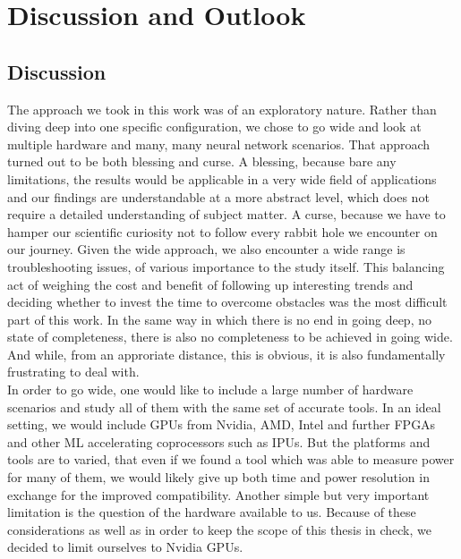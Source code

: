 \chapter{Discussion and Outlook}\label{chap:discussion}

\section{Discussion}

The approach we took in this work was of an exploratory nature. Rather than diving deep into one specific configuration, we chose to go wide and look at multiple hardware and many, many neural network scenarios. That approach turned out to be both blessing and curse. A blessing, because bare any limitations, the results would be applicable in a very wide field of applications and our findings are understandable at a more abstract level, which does not require a detailed understanding of subject matter. A curse, because we have to hamper our scientific curiosity not to follow every rabbit hole we encounter on our journey. Given the wide approach, we also encounter a wide range is troubleshooting issues, of various importance to the study itself. This balancing act of weighing the cost and benefit of following up interesting trends and deciding whether to invest the time to overcome obstacles was the most difficult part of this work. In the same way in which there is no end in going deep, no state of completeness, there is also no completeness to be achieved in going wide. And while, from an approriate distance, this is obvious, it is also fundamentally frustrating to deal with.\\
In order to go wide, one would like to include a large number of hardware scenarios and study all of them with the same set of accurate tools. In an ideal setting, we would include GPUs from Nvidia, AMD, Intel and further FPGAs and other ML accelerating coprocessors such as IPUs. But the platforms and tools are to varied, that even if we found a tool which was able to measure power for many of them, we would likely give up both time and power resolution in exchange for the improved compatibility. Another simple but very important limitation is the question of the hardware available to us. Because of these considerations as well as in order to keep the scope of this thesis in check, we decided to limit ourselves to Nvidia GPUs. \\
